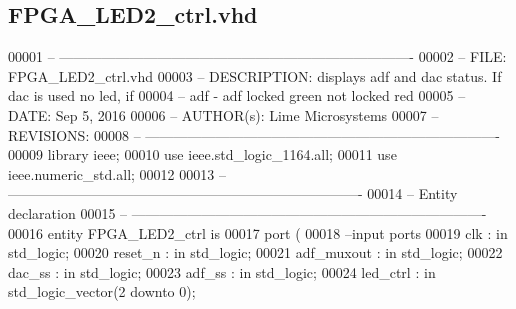 \subsection{F\+P\+G\+A\+\_\+\+L\+E\+D2\+\_\+ctrl.\+vhd}
\label{FPGA__LED2__ctrl_8vhd_source}

\begin{DoxyCode}
00001 \textcolor{keyword}{-- ---------------------------------------------------------------------------- }
00002 \textcolor{keyword}{-- FILE:    FPGA\_LED2\_ctrl.vhd}
00003 \textcolor{keyword}{-- DESCRIPTION: displays adf and dac status. If dac is used no led, if }
00004 \textcolor{keyword}{-- adf - adf locked green not locked red}
00005 \textcolor{keyword}{-- DATE:    Sep 5, 2016}
00006 \textcolor{keyword}{-- AUTHOR(s):   Lime Microsystems}
00007 \textcolor{keyword}{-- REVISIONS:}
00008 \textcolor{keyword}{-- ---------------------------------------------------------------------------- }
00009 \textcolor{vhdlkeyword}{library }\textcolor{keywordflow}{ieee};
00010 \textcolor{vhdlkeyword}{use }ieee.std\_logic\_1164.\textcolor{keywordflow}{all};
00011 \textcolor{vhdlkeyword}{use }ieee.numeric\_std.\textcolor{keywordflow}{all};
00012 
00013 \textcolor{keyword}{-- ----------------------------------------------------------------------------}
00014 \textcolor{keyword}{-- Entity declaration}
00015 \textcolor{keyword}{-- ----------------------------------------------------------------------------}
00016 \textcolor{keywordflow}{entity }FPGA_LED2_ctrl \textcolor{keywordflow}{is}
00017   \textcolor{keywordflow}{port} \textcolor{vhdlchar}{(}
00018 \textcolor{keyword}{        --input ports }
00019         \textcolor{vhdlchar}{clk}         \textcolor{vhdlchar}{:} \textcolor{keywordflow}{in} \textcolor{comment}{std\_logic};
00020         \textcolor{vhdlchar}{reset_n}     \textcolor{vhdlchar}{:} \textcolor{keywordflow}{in} \textcolor{comment}{std\_logic};
00021           \textcolor{vhdlchar}{adf_muxout}    \textcolor{vhdlchar}{:} \textcolor{keywordflow}{in} \textcolor{comment}{std\_logic};
00022           \textcolor{vhdlchar}{dac_ss}            \textcolor{vhdlchar}{:} \textcolor{keywordflow}{in} \textcolor{comment}{std\_logic};
00023           \textcolor{vhdlchar}{adf_ss}            \textcolor{vhdlchar}{:} \textcolor{keywordflow}{in} \textcolor{comment}{std\_logic};
00024           \textcolor{vhdlchar}{led_ctrl}      \textcolor{vhdlchar}{:} \textcolor{keywordflow}{in} \textcolor{comment}{std\_logic\_vector}\textcolor{vhdlchar}{(}\textcolor{vhdllogic}{}\textcolor{vhdllogic}{2} \textcolor{keywordflow}{downto} \textcolor{vhdllogic}{}\textcolor{vhdllogic}{0}\textcolor{vhdlchar}{)};

\end{DoxyCode}
